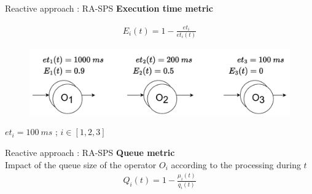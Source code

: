 \begin{frame}{Reactive approach : RA-SPS}
	\textbf{Execution time metric}
	\begin{center}
	\begin{align*}
        E_i(t) = 1-\frac{et_i}{et_i(t)}
   	\end{align*}
   	\vspace*{-0.75cm}
   	\begin{figure}
   		\includegraphics[scale=0.5]{images/concepts/reactive/RA-SPS-Metric-E.pdf}
   	\end{figure}
 	
  	$et_i = 100~ms$ ; $i \in [1,2,3]$
  	\end{center}
\end{frame}
    
\begin{frame}{Reactive approach : RA-SPS}    
	\textbf{Queue metric}\\
	\vspace*{0.2cm}
	Impact of the queue size of the operator $O_i$ according to the processing during $t$
    \begin{align*}
        Q_i(t) = 1-\frac{\mu_i(t)}{q_i(t)}
    \end{align*}
    
\end{frame}

